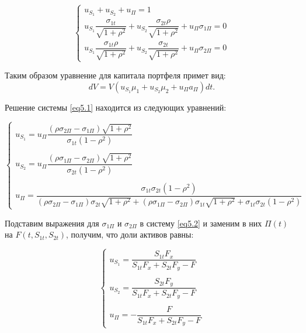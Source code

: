 \documentclass[a4paper, 12pt]{extreport}
\numberwithin{equation}{section}
\begin{document}
	\begin{equation}\label{eq5.1}
		\begin{cases}
			u_{S_1}+u_{S_2}+u_{\Pi}=1
			\\
			u_{S_1}\dfrac{\sigma_{1t}}{\sqrt{1+\rho^2}}+u_{S_2}\dfrac{\sigma_{2t}\rho}{\sqrt{1+\rho^2}}+u_{\Pi}\sigma_{1\Pi}=0
			\\
			u_{S_1}\dfrac{\sigma_{1t}\rho}{\sqrt{1+\rho^2}}+u_{S_2}\dfrac{\sigma_{2t}}{\sqrt{1+\rho^2}}+u_{\Pi}\sigma_{2\Pi}=0
		\end{cases}
	\end{equation}


	Таким образом уравнение для капитала портфеля примет вид:
	$$dV=V(u_{S_1}\mu_1+u_{S_2}\mu_2+u_{\Pi}a_{\Pi})dt .$$
	
	
	Решение системы \eqref{eq5.1} находится из следующих уравнений:
	
	\begin{equation}\label{eq5.2}
		\begin{cases}
			u_{S_1}=u_{\Pi}\dfrac{(\rho\sigma_{2\Pi}-\sigma_{1\Pi})\sqrt{1+\rho^2}}{\sigma_{1t}(1-\rho^2)}
			\\
			\\
			u_{S_2}=u_{\Pi}\dfrac{(\rho\sigma_{1\Pi}-\sigma_{2\Pi})\sqrt{1+\rho^2}}{\sigma_{2t}(1-\rho^2)}
			\\
			\\
			u_{\Pi}=\dfrac{\sigma_{1t}\sigma_{2t}(1-\rho^2)}{(\rho\sigma_{2\Pi}-\sigma_{1\Pi})\sigma_{2t}\sqrt{1+\rho^2}+(\rho\sigma_{1\Pi}-\sigma_{2\Pi})\sigma_{1t}\sqrt{1+\rho^2}+\sigma_{1t}\sigma_{2t}(1-\rho^2)}
		\end{cases}
	\end{equation}
	

	Подставим выражения для $\sigma_{1\Pi}$ и $\sigma_{2\Pi}$ в систему \eqref{eq5.2} и заменим в них $\Pi(t)$ на $F(t,S_{1t},S_{2t})$, получим, что доли активов равны:
	
	
	
	\begin{equation}\label{eq5.3}
		\begin{cases}
			u_{S_1}=\dfrac{S_{1t}F_x}{S_{1t}F_x+S_{2t}F_y-F}
			\\
			\\
			u_{S_2}=\dfrac{S_{2t}F_y}{S_{1t}F_x+S_{2t}F_y-F}
			\\
			\\
			u_{\Pi}=-\dfrac{F}{S_{1t}F_x+S_{2t}F_y-F}
		\end{cases}
	\end{equation}
	\vspace{0.3cm}
	
\end{document}
